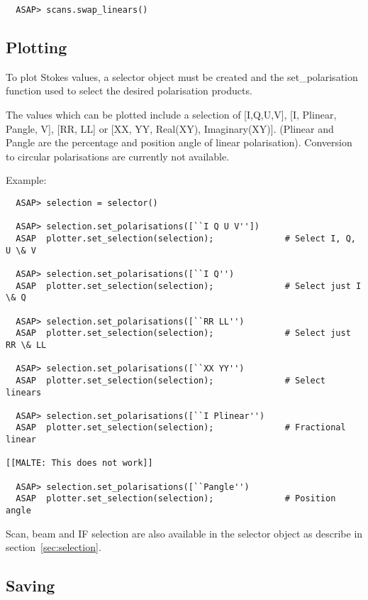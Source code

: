 \documentclass[11pt]{article}
\begin{document}
\begin{verbatim}
  ASAP> scans.swap_linears() 
\end{verbatim}

\subsection{Plotting}
\label{sec:polplot}

To plot Stokes values, a selector object
must be created and the set\_polarisation function used to select the
desired polarisation products.

The values which can be plotted include a selection of [I,Q,U,V], [I,
Plinear, Pangle, V], [RR, LL] or [XX, YY, Real(XY),
Imaginary(XY)]. (Plinear and Pangle are the percentage and position
angle of linear polarisation). Conversion to circular polarisations
are currently not available.

Example:

\begin{verbatim}
  ASAP> selection = selector()
  
  ASAP> selection.set_polarisations([``I Q U V'']) 
  ASAP  plotter.set_selection(selection);              # Select I, Q, U \& V

  ASAP> selection.set_polarisations([``I Q'') 
  ASAP  plotter.set_selection(selection);              # Select just I \& Q

  ASAP> selection.set_polarisations([``RR LL'') 
  ASAP  plotter.set_selection(selection);              # Select just RR \& LL

  ASAP> selection.set_polarisations([``XX YY'') 
  ASAP  plotter.set_selection(selection);              # Select linears

  ASAP> selection.set_polarisations([``I Plinear'') 
  ASAP  plotter.set_selection(selection);              # Fractional linear

[[MALTE: This does not work]]

  ASAP> selection.set_polarisations([``Pangle'') 
  ASAP  plotter.set_selection(selection);              # Position angle

\end{verbatim}

Scan, beam and IF selection are also available in the selector object as 
describe in section~\ref{sec:selection}.

\subsection{Saving}
\end{document}

